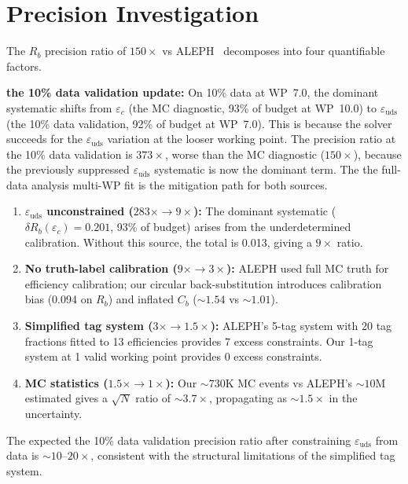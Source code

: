 \documentclass[11pt,a4paper]{article}
\begin{document}
\section{Precision Investigation}
\label{sec:precision_investigation}

The $R_b$ precision ratio of $150\times$ vs ALEPH~\cite{ALEPH:Rb:1996} decomposes
into four quantifiable factors.

\textbf{the 10\% data validation update:} On 10\% data at WP~7.0, the dominant systematic shifts from
$\varepsilon_c$ (the MC diagnostic, 93\% of budget at WP~10.0) to $\varepsilon_\mathrm{uds}$
(the 10\% data validation, 92\% of budget at WP~7.0). This is because the solver succeeds for the
$\varepsilon_\mathrm{uds}$ variation at the looser working point. The precision ratio
at the 10\% data validation is $373\times$, worse than the MC diagnostic ($150\times$), because the previously
suppressed $\varepsilon_\mathrm{uds}$ systematic is now the dominant term. The the full-data analysis
multi-WP fit is the mitigation path for both sources.

\begin{enumerate}
\item \textbf{$\varepsilon_\mathrm{uds}$ unconstrained ($283\times \to 9\times$):}
The dominant systematic ($\delta R_b(\varepsilon_c) = 0.201$, 93\% of budget) arises from the
underdetermined calibration. Without this source, the total is 0.013, giving a
$9\times$ ratio.

\item \textbf{No truth-label calibration ($9\times \to 3\times$):} ALEPH used full
MC truth for efficiency calibration; our circular back-substitution introduces
calibration bias (0.094 on $R_b$) and inflated $C_b$ ($\sim 1.54$ vs $\sim 1.01$).

\item \textbf{Simplified tag system ($3\times \to 1.5\times$):} ALEPH's 5-tag system
with 20 tag fractions fitted to 13 efficiencies provides 7 excess constraints. Our
1-tag system at 1 valid working point provides 0 excess constraints.

\item \textbf{MC statistics ($1.5\times \to 1\times$):} Our $\sim 730$K MC events vs
ALEPH's $\sim 10$M estimated gives a $\sqrt{N}$ ratio of $\sim 3.7\times$,
propagating as $\sim 1.5\times$ in the uncertainty.
\end{enumerate}

The expected the 10\% data validation precision ratio after constraining $\varepsilon_\mathrm{uds}$
from data is $\sim 10$--$20\times$, consistent with the structural limitations
of the simplified tag system.
\end{document}
